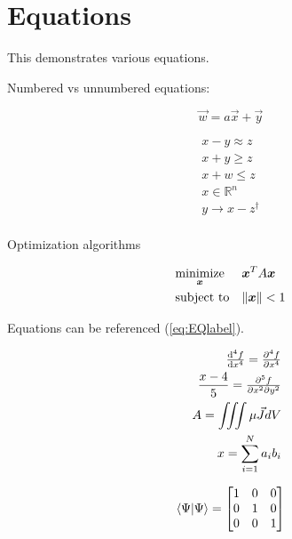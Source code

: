 \section{Equations} \label{sec:Equations} 
  This demonstrates various equations.
  
  Numbered vs unnumbered equations:

  \begin{equation}
    \vec{w} = a \vec{x} + \vec{y}   %
  \end{equation}
  
  \begin{equation*}
    \begin{aligned}
      x - y \approx z \\            %
      x + y \ge z \\                %
      x + w \le z \\                %
      x \in \mathbb{R}^n \\         %
      y \to x - z^{\dagger} \\      %
    \end{aligned}
  \end{equation*}
  
  Optimization algorithms

  \begin{equation}
    \begin{aligned}
      & \underset{\bm{x}}{\text{minimize}}
      & & \bm{x}^T A \bm{x} \\
      & \text{subject to}
      & & \norm{\bm{x}} < 1 \\          %
    \label{eq:EQlabel}
    \end{aligned}
  \end{equation}
 
  Equations can be referenced (\ref{eq:EQlabel}).

 \begin{equation*}
  \begin{aligned}
      & & \od[4]{f}{x} = \pd[4]{f}{x} \\              %
      & & \frac{x - 4}{5} = \md{f}{5}{x}{2}{y}{2} \\  %
      & & A = \iiint \mu \vec{J} dV \\                %
      & & x = \sum_{i=1}^N a_ib_i \\                  %
  \end{aligned}
 \end{equation*}

  \begin{equation}
    \bra{\Psi}\ket{\Psi} = \begin{bmatrix}            %
                              1 & 0 & 0 \\
                              0 & 1 & 0 \\
                              0 & 0 & 1 \\
                            \end{bmatrix}
  \end{equation}
 

